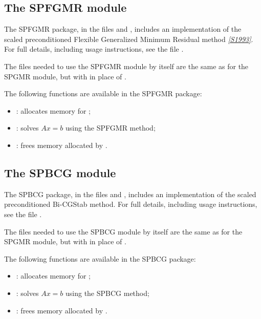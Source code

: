 \documentclass[letterpaper,10pt,english]{sphinxmanual}
\begin{document}
\subsection{The SPFGMR module}
\label{linear_solvers/SPILS:the-spfgmr-module}
The SPFGMR package, in the files  and
, includes an implementation of the scaled
preconditioned Flexible Generalized Minimum Residual method
\label{linear_solvers/SPILS:id1}{\hyperref[References:s1993]{\emph{{[}S1993{]}}}}. For full details, including usage instructions, see the file
.

The files needed to use the SPFGMR module by itself are the same as for
the SPGMR module, but with  in place of
.

The following functions are available in the SPFGMR package:
\begin{itemize}
\item {} 
: allocates memory for ;

\item {} 
: solves \(Ax = b\) using the SPFGMR method;

\item {} 
: frees memory allocated by .

\end{itemize}


\subsection{The SPBCG module}
\label{linear_solvers/SPILS:the-spbcg-module}
The SPBCG package, in the files  and
, includes an implementation of the scaled
preconditioned Bi-CGStab method. For full details, including usage
instructions, see the file .

The files needed to use the SPBCG module by itself are the same as for
the SPGMR module, but with  in place of
.

The following functions are available in the SPBCG package:
\begin{itemize}
\item {} 
: allocates memory for ;

\item {} 
: solves \(Ax = b\) using the SPBCG method;

\item {} 
: frees memory allocated by .

\end{itemize}
\end{document}
